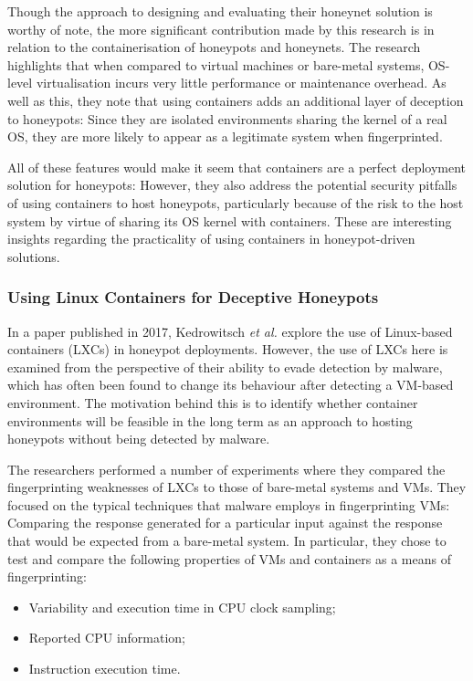     Though the approach to designing and evaluating their honeynet solution is worthy of note, the more significant contribution made by this research is in relation to the containerisation of honeypots and honeynets. The research highlights that when compared to virtual machines or bare-metal systems, OS-level virtualisation incurs very little performance or maintenance overhead. \cite{Pisarcik:2014:FDV:2659651.2659685} As well as this, they note that using containers adds an additional layer of deception to honeypots: Since they are isolated environments sharing the kernel of a real OS, they are more likely to appear as a legitimate system when fingerprinted. 
    
    All of these features would make it seem that containers are a perfect deployment solution for honeypots: However, they also address the potential security pitfalls of using containers to host honeypots, particularly because of the risk to the host system by virtue of sharing its OS kernel with containers. These are interesting insights regarding the practicality of using containers in honeypot-driven solutions.

   
    \subsubsection{Using Linux Containers for Deceptive Honeypots} \label{AboutDeceptiveHoneypots}
    In a paper published in 2017, Kedrowitsch \textit{et al.} explore the use of Linux-based containers (LXCs) in honeypot deployments. \cite{LXCsForDeceptiveHoneypots2017} However, the use of LXCs here is examined from the perspective of their ability to evade detection by malware, which has often been found to change its behaviour after detecting a VM-based environment. \cite{SpotlessSandboxes} The motivation behind this is to identify whether container environments will be feasible in the long term as an approach to hosting honeypots without being detected by malware.

The researchers performed a number of experiments where they compared the fingerprinting weaknesses of LXCs to those of bare-metal systems and VMs. They focused on the typical techniques that malware employs in fingerprinting VMs: Comparing the response generated for a particular input against the response that would be expected from a bare-metal system. In particular, they chose to test and compare the following properties of VMs and containers as a means of fingerprinting:

\begin{itemize}
    \item Variability and execution time in CPU clock sampling;
    \item Reported CPU information;
    \item Instruction execution time.
\end{itemize}

